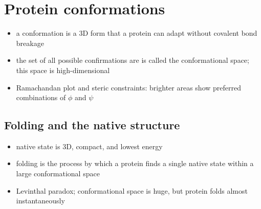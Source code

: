 \documentclass[10pt]{article}
\newenvironment{mitemize}
{
  \begin{itemize}
  \setlength{\itemsep}{1pt}
  \setlength{\parskip}{0pt}
  \setlength{\parsep}{0pt}}{\end{itemize}
}
\begin{document}
\section*{Protein conformations}
  \begin{mitemize}
    \item a conformation is a 3D form that a protein can adapt without covalent bond breakage
    \item the set of all possible confirmations are is called the conformational space; this space is high-dimensional
    \item Ramachandan plot and steric constraints: brighter areas show preferred combinations of $\phi$ and $\psi$
  \end{mitemize}
  \subsection*{Folding and the native structure}
    \begin{mitemize}
      \item native state is 3D, compact, and lowest energy
      \item folding is the process by which a protein finds a single native state within a large conformational space
      \item Levinthal paradox; conformational space is huge, but protein folds almost instantaneously
    \end{mitemize}
\end{document}
